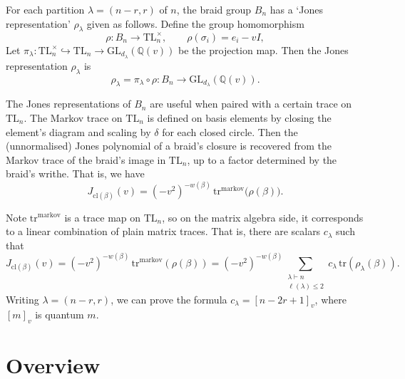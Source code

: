 ﻿\documentclass[10pt]{article}
\newcommand{\TL}{\mathrm{TL}}
\newcommand{\trm}{\mathrm{tr}^{\mathrm{markov}}}
\newcommand{\Tr}{\mathrm{tr}}
\newcommand{\cl}{\mathrm{cl}}
\newcommand{\qq}[1]{\left[#1\right]_v}
\begin{document}
For each partition $\lambda = (n-r,r)$ of $n$, the braid group $B_n$ has a `Jones representation' $\rho_\lambda$ given as follows. Define the group homomorphism 
\[
\rho: B_n\to\TL_n^\times,\qquad \rho(\sigma_i)=e_i-vI,
\] 
Let \(\pi_\lambda:\TL_n^\times\hookrightarrow\TL_n\to\mathrm{GL}_{d_\lambda}(\mathbb{Q}(v))\) be the projection map. Then the Jones representation $\rho_\lambda$ is 
\[
\rho_\lambda=\pi_\lambda\circ\rho:B_n\to\mathrm{GL}_{d_\lambda}(\mathbb{Q}(v)).
\]

The Jones representations of $B_n$ are useful when paired with a certain trace on $\TL_n$. 
The Markov trace on $\TL_n$ is defined on basis elements by closing the element's diagram 
and scaling by $\delta$ for each closed circle. 
Then the (unnormalised) Jones polynomial of a braid's closure is recovered from the
Markov trace of the braid's image in $\TL_n$, up to a factor determined by the braid's writhe. 
That is, we have
\[
J_{\cl(\beta)}(v)=(-v^2)^{-w(\beta)}\,\trm\bigl(\rho(\beta)\bigr).
\]

Note \(\trm\) is a trace map on $\TL_n$, so on the matrix algebra side, it corresponds to a linear combination 
of plain matrix traces. That is, there are scalars \(c_\lambda\) such that
\[
J_{\cl(\beta)}(v)
 =(-v^2)^{-w(\beta)}\,\trm(\rho(\beta))
 =(-v^2)^{-w(\beta)}\sum_{\substack{\lambda \vdash n \\ \ell(\lambda)\le 2}}  
c_\lambda\,\Tr(\rho_\lambda(\beta)).
\] 
Writing \(\lambda=(n-r,r)\), we can prove the formula $c_\lambda=\qq{n-2r+1}$, where $\qq{m}$ is quantum $m$. 






\newpage





\section{Overview}
\end{document}
